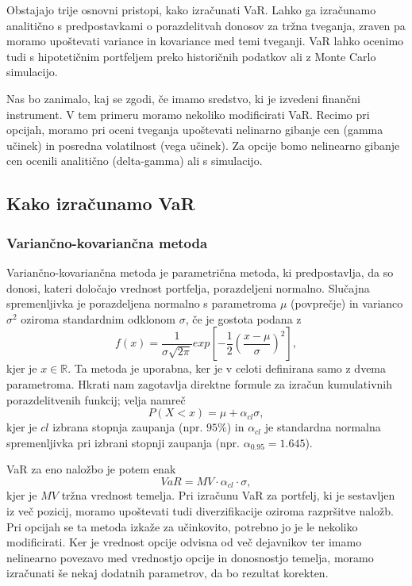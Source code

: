 \documentclass[12pt,a4paper]{amsart}
\theoremstyle{definition} %
\theoremstyle{definition}
\theoremstyle{definition}
\theoremstyle{definition}
\theoremstyle{plain} %
\newcommand{\R}{\mathbb R}
\newcommand{\al}{\alpha}
\begin{document}
Obstajajo trije osnovni pristopi, kako izračunati VaR. Lahko ga izračunamo analitično
s predpostavkami o porazdelitvah donosov za tržna tveganja, zraven pa moramo upoštevati variance
in kovariance med temi tveganji. VaR lahko ocenimo tudi s hipotetičnim portfeljem preko historičnih 
podatkov ali z Monte Carlo simulacijo. 

Nas bo zanimalo, kaj se zgodi, če imamo sredstvo, ki je izvedeni finančni instrument. V tem primeru moramo 
nekoliko modificirati VaR.
Recimo pri opcijah, moramo pri oceni tveganja upoštevati nelinarno gibanje cen (gamma učinek)
in posredna volatilnost (vega učinek). %
Za opcije bomo nelinearno gibanje cen ocenili analitično (delta-gamma) ali s simulacijo.

\subsection{Kako izračunamo VaR}

\subsubsection{Variančno-kovariančna metoda}

Variančno-kovariančna metoda je parametrična metoda, ki predpostavlja, da so donosi, 
kateri določajo vrednost portfelja,
porazdeljeni normalno. Slučajna spremenljivka je porazdeljena normalno s parametroma $\mu$ (povprečje)
in varianco $\sigma^2$ oziroma standardnim odklonom $\sigma$, če je gostota podana z 
\begin{equation}
    f(x) = \frac{1}{\sigma\sqrt{2\pi}}exp[-\frac{1}{2}(\frac{x-\mu}{\sigma})^2],
\end{equation}
kjer je $x\in \R$. Ta metoda je uporabna, ker je v celoti definirana samo z dvema parametroma. 
Hkrati nam zagotavlja direktne formule za izračun kumulativnih porazdelitvenih funkcij; velja namreč
\begin{equation}
    P(X<x) = \mu + \al_{cl}\sigma,
\end{equation}
kjer je $cl$ izbrana stopnja zaupanja (npr. $95\%$) in $\al_{cl}$ je standardna normalna spremenljivka pri izbrani stopnji zaupanja
(npr. $\al_{0.95}=1.645$). 

VaR za eno naložbo je potem enak
\begin{equation}
    VaR = MV\cdot \al_{cl} \cdot \sigma,
\end{equation}
kjer je $MV$ tržna vrednost temelja. Pri izračunu VaR za portfelj, ki je sestavljen iz več pozicij,
moramo upoštevati tudi diverzifikacije oziroma razpršitve naložb.
Pri opcijah se ta metoda izkaže za učinkovito, potrebno jo je le nekoliko modificirati. Ker je vrednost opcije odvisna od več dejavnikov 
ter imamo nelinearno povezavo med vrednostjo opcije in donosnostjo temelja, moramo izračunati še nekaj dodatnih parametrov, da bo rezultat korekten.
\end{document}
